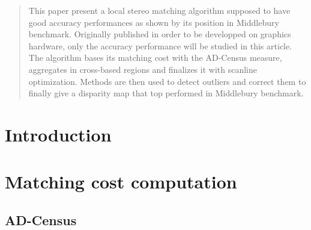 \documentclass{ipol}
\begin{document}
\begin{abstract}
This paper present a local stereo matching algorithm supposed to have good accuracy performances as shown by its position in Middlebury benchmark. Originally published in order to be developped on graphics hardware, only the accuracy performance will be studied in this article. The algorithm bases its matching cost with the AD-Census measure, aggregates in cross-based regions and finalizes it with scanline optimization. Methods are then used to detect outliers and correct them to finally give a disparity map that top performed in Middlebury benchmark.
\end{abstract} 

\section{Introduction}

\section{Matching cost computation}

\subsection{AD-Census}
\end{document}
